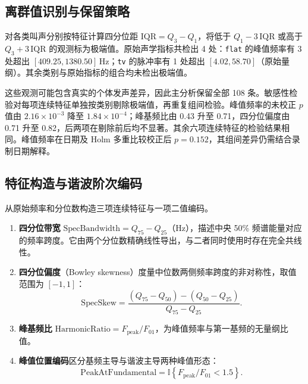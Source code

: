 \documentclass{apmcmthesis}
\begin{document}
\subsection{离群值识别与保留策略}

对各类叫声分别按特征计算四分位距 $\mathrm{IQR}=Q_3-Q_1$，将低于 $Q_1-3\,\mathrm{IQR}$ 或高于 $Q_3+3\,\mathrm{IQR}$ 的观测标为极端值。原始声学指标共检出 4 处：\texttt{flat} 的峰值频率有 3 处超出 $[409.25,1380.50]\,\mathrm{Hz}$；\texttt{tv} 的脉冲率有 1 处超出 $[4.02,58.70]$（原始量纲）。其余类别与原始指标的组合均未检出极端值。

这些观测可能包含真实的个体发声差异，因此主分析保留全部 108 条。敏感性检验对每项连续特征单独按类别剔除极端值，再重复组间检验。峰值频率的未校正 $p$ 值由 $2.16\times10^{-3}$ 降至 $1.84\times10^{-4}$；峰基频比由 0.43 升至 0.71，四分位偏度由 0.71 升至 0.82，后两项在剔除前后均不显著。其余六项连续特征的检验结果相同。峰值频率在日期及 Holm 多重比较校正后 $p=0.152$，其组间差异仍需结合录制日期解释。

\subsection{特征构造与谐波阶次编码}

从原始频率和分位数构造三项连续特征与一项二值编码。
\begin{enumerate}
\item \textbf{四分位带宽} $\mathrm{SpecBandwidth}=Q_{75}-Q_{25}$（Hz），描述中央 50\% 频谱能量对应的频率跨度。它由两个分位数精确线性导出，与二者同时使用时存在完全共线性。
\item \textbf{四分位偏度}（Bowley skewness）度量中位数两侧频率跨度的非对称性，取值范围为 $[-1,1]$：
\begin{equation}
    \mathrm{SpecSkew}=\frac{(Q_{75}-Q_{50})-(Q_{50}-Q_{25})}{Q_{75}-Q_{25}}.
\end{equation}
\item \textbf{峰基频比} $\mathrm{HarmonicRatio}=F_{\mathrm{peak}}/F_{01}$，为峰值频率与第一基频的无量纲比值。
\item \textbf{峰值位置编码}区分基频主导与谐波主导两种峰值形态：
\begin{equation}
    \mathrm{PeakAtFundamental}=\mathbb{I}\!\left\{F_{\mathrm{peak}}/F_{01}<1.5\right\}.
\end{equation}
\end{enumerate}
\end{document}

